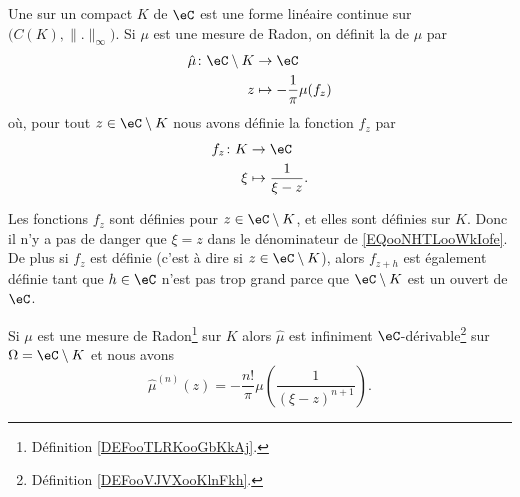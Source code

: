 \begin{definition}      \label{DEFooTLRKooGbKkAj}
    Une  sur un compact \(  K\) de \( \eC\) est une forme linéaire continue sur \( \big( C(K),\| . \|_{\infty} \big)\). Si \( \mu\) est une mesure de Radon, on définit la  de \( \mu\) par
	\begin{equation}
		\begin{aligned}
			\hat \mu\colon \eC\setminus K & \to \eC                                                      \\
            z                             & \mapsto -\frac{1}{ \pi }\mu(f_z)
		\end{aligned}
	\end{equation}
    où, pour tout \( z\in \eC\setminus K\) nous avons définie la fonction \( f_z\) par
    \begin{equation}        \label{EQooNHTLooWkIofe}
        \begin{aligned}
            f_z\colon K&\to \eC \\
            \xi&\mapsto \frac{1}{ \xi-z }.
        \end{aligned}
    \end{equation}
\end{definition}

\begin{normaltext}
    Les fonctions \( f_z\) sont définies pour \( z\in \eC\setminus K\), et elles sont définies sur \( K\). Donc il n'y a pas de danger que \( \xi=z\) dans le dénominateur de \eqref{EQooNHTLooWkIofe}. De plus si \( f_z\) est définie (c'est à dire si \( z\in \eC\setminus K\)), alors \( f_{z+h}\) est également définie tant que \( h\in \eC\) n'est pas trop grand parce que \( \eC\setminus K\) est un ouvert de \( \eC\).
\end{normaltext}

\begin{theorem}     \label{ThoJVNTzn}
    Si \( \mu\) est une mesure de Radon\footnote{Définition \ref{DEFooTLRKooGbKkAj}.} sur \( K\) alors \( \hat \mu\) est infiniment \( \eC\)-dérivable\footnote{Définition \ref{DEFooVJVXooKlnFkh}.} sur \( \Omega=\eC\setminus K\) et nous avons
	\begin{equation}
		\hat\mu^{(n)}(z)=-\frac{ n! }{ \pi }\mu\left( \frac{1}{ (\xi-z)^{n+1} } \right).
	\end{equation}
\end{theorem}


